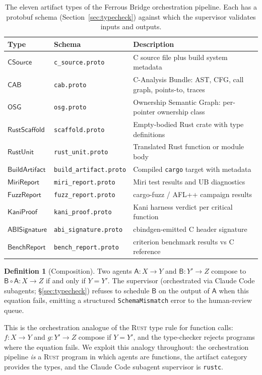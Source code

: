 \documentclass[12pt]{article}
\theoremstyle{definition}
\newtheorem{definition}[theorem]{Definition}
\theoremstyle{remark}
\newcommand{\rust}{\textnormal{\textsc{Rust}}}
\newcommand{\Agent}[1]{\ensuremath{\mathsf{#1}}}
\newcommand{\Artifact}[1]{\ensuremath{\mathsf{#1}}}
\newcommand{\CSrc}{\Artifact{CSource}}
\newcommand{\CAB}{\Artifact{CAB}}
\newcommand{\OSG}{\Artifact{OSG}}
\newcommand{\Scaff}{\Artifact{RustScaffold}}
\newcommand{\RUnit}{\Artifact{RustUnit}}
\newcommand{\BArt}{\Artifact{BuildArtifact}}
\newcommand{\MiriR}{\Artifact{MiriReport}}
\newcommand{\FuzzR}{\Artifact{FuzzReport}}
\newcommand{\KaniP}{\Artifact{KaniProof}}
\newcommand{\ABISig}{\Artifact{ABISignature}}
\newcommand{\BenchR}{\Artifact{BenchReport}}
\begin{document}
\begin{table}[h]
\centering
\small
\begin{tabular}{|l|l|l|}
\hline
\textbf{Type} & \textbf{Schema} & \textbf{Description}\\
\hline
\CSrc & \texttt{c\_source.proto} & C source file plus build system metadata\\
\CAB & \texttt{cab.proto} & C-Analysis Bundle: AST, CFG, call graph, points-to, traces\\
\OSG & \texttt{osg.proto} & Ownership Semantic Graph: per-pointer ownership class\\
\Scaff & \texttt{scaffold.proto} & Empty-bodied Rust crate with type definitions\\
\RUnit & \texttt{rust\_unit.proto} & Translated Rust function or module body\\
\BArt & \texttt{build\_artifact.proto} & Compiled \texttt{cargo} target with metadata\\
\MiriR & \texttt{miri\_report.proto} & Miri test results and UB diagnostics\\
\FuzzR & \texttt{fuzz\_report.proto} & cargo-fuzz / AFL++ campaign results\\
\KaniP & \texttt{kani\_proof.proto} & Kani harness verdict per critical function\\
\ABISig & \texttt{abi\_signature.proto} & cbindgen-emitted C header signature\\
\BenchR & \texttt{bench\_report.proto} & criterion benchmark results vs C reference\\
\hline
\end{tabular}
\caption{The eleven artifact types of the Ferrous Bridge orchestration
pipeline. Each has a protobuf schema (Section~\ref{sec:typecheck})
against which the supervisor validates inputs and outputs.}
\label{tab:artifact-types}
\end{table}

\begin{definition}[Composition]
\label{def:composition}
Two agents \(\Agent{A} : X \to Y\) and \(\Agent{B} : Y' \to Z\) compose
to \(\Agent{B} \circ \Agent{A} : X \to Z\) if and only if \(Y = Y'\).
The supervisor (orchestrated via Claude Code subagents; \S{}\ref{sec:typecheck}) refuses to schedule
\(\Agent{B}\) on the output of \(\Agent{A}\) when this equation fails,
emitting a structured \texttt{SchemaMismatch} error to the
human-review queue.
\end{definition}

This is the orchestration analogue of the \rust{} type rule for
function calls: \(f : X \to Y\) and \(g : Y' \to Z\) compose if
\(Y = Y'\), and the type-checker rejects programs where the equation
fails. We exploit this analogy throughout: the orchestration pipeline
\emph{is} a \rust{} program in which agents are functions, the
artifact category provides the types, and the Claude Code subagent supervisor is
\texttt{rustc}.
\end{document}
